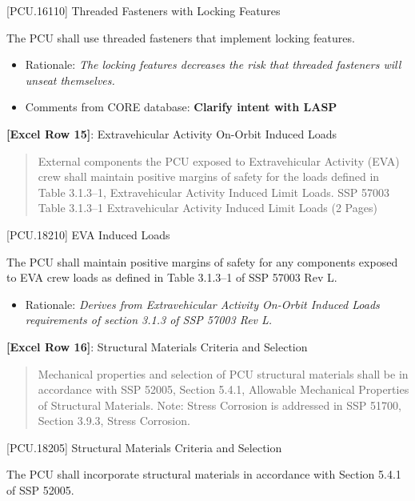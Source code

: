 [PCU.16110] Threaded Fasteners with Locking Features

The PCU shall use threaded fasteners that implement locking features.

\begin{itemize}
\item{} Rationale: \emph{The locking features decreases the risk that threaded fasteners will unseat themselves.}

\item{} Comments from CORE database: \textbf{Clarify intent with LASP}

\end{itemize}

\textbf{[Excel Row 15]}: Extravehicular Activity On-Orbit Induced Loads

\begin{quote}
External components the PCU exposed to Extravehicular Activity (EVA) crew shall maintain positive margins of safety for the loads defined in Table 3.1.3--1, Extravehicular Activity Induced Limit Loads.
SSP 57003 Table 3.1.3--1 Extravehicular Activity Induced Limit Loads (2 Pages)
\end{quote}

[PCU.18210] EVA Induced Loads

The PCU shall maintain positive margins of safety for any components exposed to EVA crew loads as defined in Table 3.1.3--1 of SSP 57003 Rev L.

\begin{itemize}
\item{} Rationale: \emph{Derives from Extravehicular Activity On-Orbit Induced Loads requirements of section 3.1.3 of SSP 57003 Rev L.}

\end{itemize}

\textbf{[Excel Row 16]}: Structural Materials Criteria and Selection

\begin{quote}
Mechanical properties and selection of PCU structural materials shall be in accordance with SSP 52005, Section 5.4.1, Allowable Mechanical Properties of Structural Materials.
Note: Stress Corrosion is addressed in SSP 51700, Section 3.9.3, Stress Corrosion.
\end{quote}

[PCU.18205] Structural Materials Criteria and Selection

The PCU shall incorporate structural materials in accordance with Section 5.4.1 of SSP 52005.

